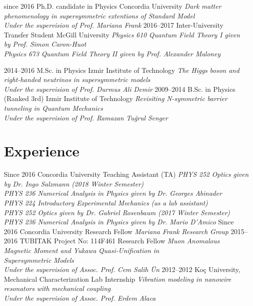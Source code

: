\documentclass[]{friggeri-cv}
\begin{document}
\begin{entrylist}
  \entry
    {since 2016}
    {Ph.D. candidate in Physics}
    {Concordia University}
    {\emph{Dark matter phenomenology in supersymmetric extentions of Standard Model \\
    		Under the supervision of Prof. Mariana Frank}}
   \entry
   {2016--2017}
   {Inter-University Transfer Student}
   {McGill University}
   {\emph{Physics 610 Quantum Field Theory I given by Prof. Simon Caron-Huot \\
      Physics 673 Quantum Field Theory II given by Prof. Alexander Maloney }}
   
	
   
  \entry
    {2014–2016}
    {M.Sc. in Physics}
    {Izmir Institute of Technology}
    {\emph{The Higgs boson and right-handed neutrinos in supersymmetric models \\
    		Under the supervision of Prof. Durmus Ali Demir}}
  \entry
    {2009–2014}
    {B.Sc. in Physics (Ranked 3rd)}
    {Izmir Institute of Technology}
    {\emph{Revisiting N-symmetric barrier tunneling in Quantum Mechanics \\
		   Under the supervision of Prof. Ramazan Tuğrul Senger	
    }}
    

\end{entrylist}

\section{Experience}

\begin{entrylist}
  \entry
    {Since 2016}
    {Concordia University}
    {Teaching Assistant (TA)}
    {\emph{PHYS 252 Optics given by Dr. Ingo Salzmann (2018 Winter Semester) \\ 
	PHYS 236 Numerical Analysis in Physics given by Dr. Georges Abinader \\
	PHYS 224 Introductory Experimental Mechanics (as a lab assistant) \\
	PHYS 252 Optics given by Dr. Gabriel Rosenbaum (2017 Winter Semester)
	PHYS 236 Numerical Analysis in Physics given by Dr. Mario D'Amico
	}}
  \entry
    {Since 2016}
    {Concordia University}
    {Research Fellow}
    {\emph{Mariana Frank Research Group}}
  \entry
    {2015--2016}
    {TUBITAK Project No: 114F461}
    {Research Fellow}
    {\emph{Muon Anomalous Magnetic Moment and Yukawa Quasi-Unification in \\ Supersymmetric Models \\
    		Under the supervision of Assoc. Prof. Cem Salih Ün}}  
  \entry
  	{2012--2012}
  	{Koç University, Mechanical Characterization Lab}
  	{Internship}
  	{\emph{Vibration modeling in nanowire resonators with mechanical coupling \\
  	 Under the supervision of Assoc. Prof. Erdem Alaca}}  
\end{entrylist}
\end{document}
